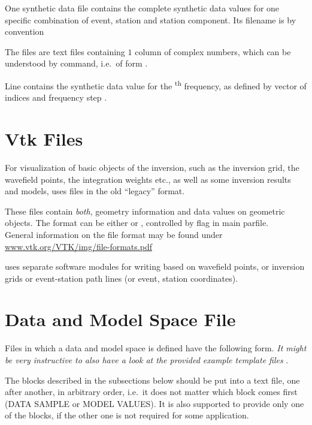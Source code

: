 One synthetic data file contains the complete synthetic data values for one specific combination of
event, station and station component. Its filename is by convention 

The files are text files containing $1$ column of   
complex numbers, which can be understood by   command, i.e.\ of form  .

Line  contains the synthetic data value for the \textsuperscript{th} frequency, as defined by vector
of indices  and frequency step .
%
\section{Vtk Files} \label{files,sec:vtk_files}
%
For visualization of basic objects of the inversion, such as the inversion grid, 
the wavefield points, the integration weights etc., as well as some inversion results
and models, \ASKI{} uses  files in the old ``legacy'' format.

These files contain \emph{both}, geometry
information and data values on geometric objects. The format can be either  or 
, controlled by flag  in main parfile.\\
General information on the file format may be found under \url{www.vtk.org/VTK/img/file-formats.pdf}

\ASKI{} uses separate software modules for writing  based on wavefield points, or 
inversion grids or event-station path lines (or event, station coordinates). 
%
\section{Data and Model Space File} \label{files,sec:dmspace}
%
Files in which a data and model space is defined have the following form. \emph{It might be very instructive 
to also have a look at the provided example template files}  .

The blocks described in the subsections below should be put into a text file, one after another, in arbitrary order, 
i.e.\ it does not matter which block comes first (DATA SAMPLE or MODEL VALUES). It is
also supported to provide only one of the blocks, if the other one is not required for some application. 

